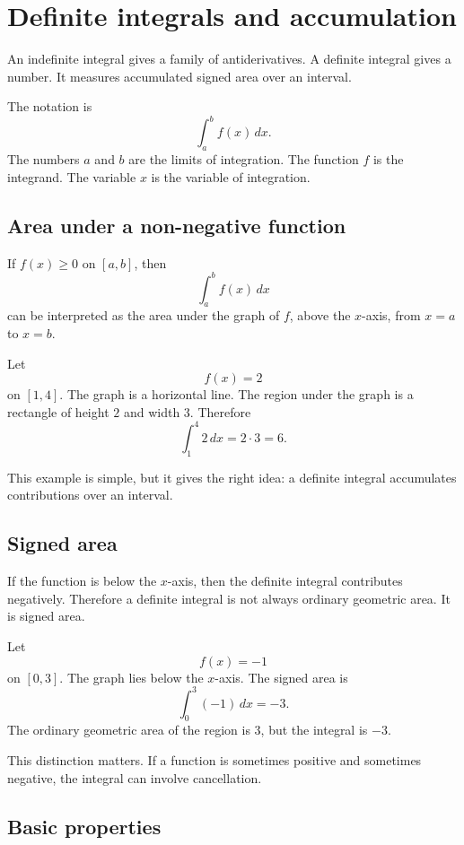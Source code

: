 \section{Definite integrals and accumulation}

An indefinite integral gives a family of antiderivatives. A definite integral gives a number. It measures accumulated signed area over an interval.

The notation is
\[
\int_a^b f(x)\,dx.
\]
The numbers \(a\) and \(b\) are the limits of integration. The function \(f\) is the integrand. The variable \(x\) is the variable of integration.

\subsection*{Area under a non-negative function}

If \(f(x)\ge0\) on \([a,b]\), then
\[
\int_a^b f(x)\,dx
\]
can be interpreted as the area under the graph of \(f\), above the \(x\)-axis, from \(x=a\) to \(x=b\).

\begin{examplebox}
Let
\[
f(x)=2
\]
on \([1,4]\). The graph is a horizontal line. The region under the graph is a rectangle of height \(2\) and width \(3\). Therefore
\[
\int_1^4 2\,dx=2\cdot3=6.
\]
\end{examplebox}

This example is simple, but it gives the right idea: a definite integral accumulates contributions over an interval.

\subsection*{Signed area}

If the function is below the \(x\)-axis, then the definite integral contributes negatively. Therefore a definite integral is not always ordinary geometric area. It is signed area.

\begin{examplebox}
Let
\[
f(x)=-1
\]
on \([0,3]\). The graph lies below the \(x\)-axis. The signed area is
\[
\int_0^3 (-1)\,dx=-3.
\]
The ordinary geometric area of the region is \(3\), but the integral is \(-3\).
\end{examplebox}

This distinction matters. If a function is sometimes positive and sometimes negative, the integral can involve cancellation.

\subsection*{Basic properties}


